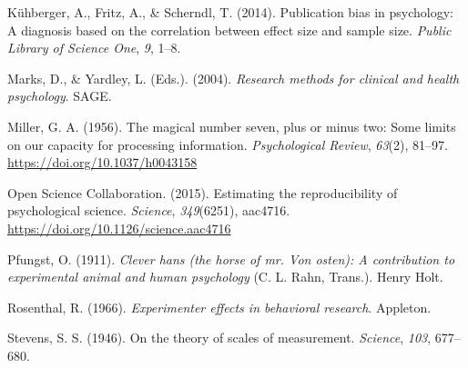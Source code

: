 \documentclass[
  11pt,
]{book}
\newlength{\cslhangindent}
\newlength{\cslentryspacingunit} %
\newenvironment{CSLReferences}[2] %
 {%
  \setlength{\parindent}{0pt}
  \ifodd #1
  \let\oldpar\par
  \def\par{\hangindent=\cslhangindent\oldpar}
  \fi
  \setlength{\parskip}{#2\cslentryspacingunit}
 }%
 {}
\theoremstyle{indenteddefinition}
\theoremstyle{indenteddefinition}
\theoremstyle{definition}
\theoremstyle{definition}
\theoremstyle{remark}
\begin{document}
\begin{CSLReferences}{1}{0}
\leavevmode{}%
Kühberger, A., Fritz, A., \& Scherndl, T. (2014). Publication bias in psychology: A diagnosis based on the correlation between effect size and sample size. \emph{Public Library of Science One}, \emph{9}, 1--8.

\leavevmode{}%
Marks, D., \& Yardley, L. (Eds.). (2004). \emph{Research methods for clinical and health psychology}. {SAGE}.

\leavevmode{}%
Miller, G. A. (1956). The magical number seven, plus or minus two: {Some} limits on our capacity for processing information. \emph{Psychological Review}, \emph{63}(2), 81--97. \url{https://doi.org/10.1037/h0043158}

\leavevmode{}%
Open Science Collaboration. (2015). Estimating the reproducibility of psychological science. \emph{Science}, \emph{349}(6251), aac4716. \url{https://doi.org/10.1126/science.aac4716}

\leavevmode{}%
Pfungst, O. (1911). \emph{Clever hans (the horse of mr. Von osten): A contribution to experimental animal and human psychology} (C. L. Rahn, Trans.). Henry Holt.

\leavevmode{}%
Rosenthal, R. (1966). \emph{Experimenter effects in behavioral research}. Appleton.

\leavevmode{}%
Stevens, S. S. (1946). On the theory of scales of measurement. \emph{Science}, \emph{103}, 677--680.

\end{CSLReferences}
\end{document}
